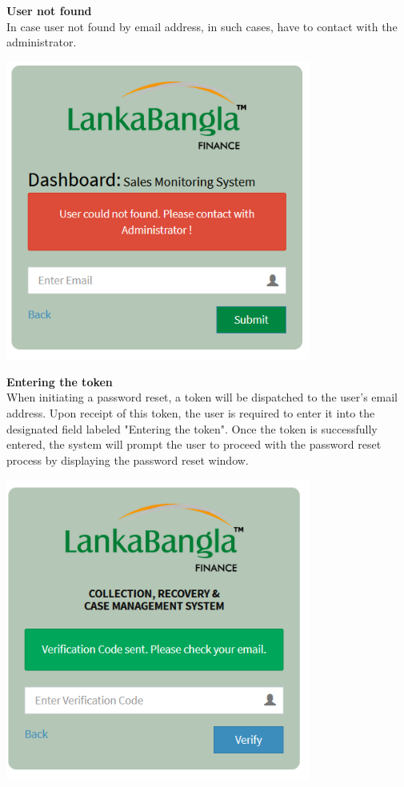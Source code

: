 \documentclass{article}
\begin{document}

\textbf{User not found}\\
In case user not found by email address, in such cases, have to contact with the administrator. 
\begin{center}
    \includegraphics[width=0.75\textwidth]{image/usernot_found_forget_pass.png}
\end{center}

\textbf{Entering the token}\\
When initiating a password reset, a token will be dispatched to the user's email address. Upon receipt of this token, the user is required to enter it into the designated field labeled "Entering the token". Once the token is successfully entered, the system will prompt the user to proceed with the password reset process by displaying the password reset window.
\begin{center}
    \includegraphics[width=0.75\textwidth]{image/verification_code_send.png}
\end{center}
\end{document}
